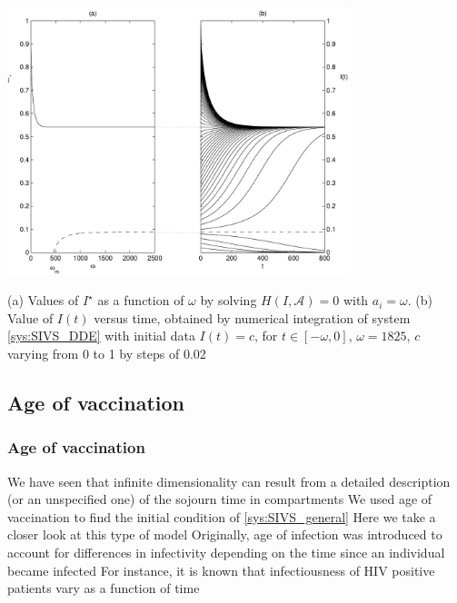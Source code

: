 \documentclass[aspectratio=169]{beamer}\usepackage[]{graphicx}\usepackage[]{xcolor}
\begin{document}
\begin{frame}
\begin{center}
   \includegraphics[width=0.75\textwidth]{FIGS/bif_and_time}
\end{center}
(a) Values of $I^\star$ as a function of $\omega$ by solving $H(I,\mathcal{A})=0$ with $a_i=\omega$. (b) Value of $I(t)$ versus time, obtained by numerical integration of system \eqref{sys:SIVS_DDE} with initial data $I(t)=c$, for $t\in[-\omega,0]$, $\omega=1825$, $c$ varying from 0 to 1 by steps of 0.02
\end{frame}

\subsection{Age of vaccination}
\begin{frame}\frametitle{Age of vaccination}
We have seen that infinite dimensionality can result from a detailed description (or an unspecified one) of the sojourn time in compartments
\vfill
We used age of vaccination to find the initial condition of \eqref{sys:SIVS_general}
\vfill
Here we take a closer look at this type of model
\vfill
Originally, age of infection was introduced to account for differences in infectivity depending on the time since an individual became infected
\vfill
For instance, it is known that infectiousness of HIV positive patients vary as a function of time
\end{frame}



\end{document}
